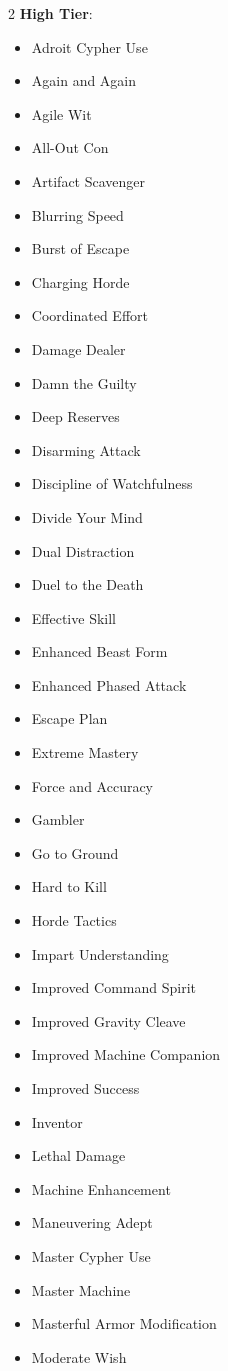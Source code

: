 \begin{multicols}{2}
\textbf{High Tier}:

\begin{itemize}
\item Adroit Cypher Use
\item Again and Again
\item Agile Wit
\item All-Out Con
\item Artifact Scavenger
\item Blurring Speed
\item Burst of Escape
\item Charging Horde
\item Coordinated Effort
\item Damage Dealer
\item Damn the Guilty
\item Deep Reserves
\item Disarming Attack
\item Discipline of Watchfulness
\item Divide Your Mind
\item Dual Distraction
\item Duel to the Death
\item Effective Skill
\item Enhanced Beast Form
\item Enhanced Phased Attack
\item Escape Plan
\item Extreme Mastery
\item Force and Accuracy
\item Gambler
\item Go to Ground
\item Hard to Kill
\item Horde Tactics
\item Impart Understanding
\item Improved Command Spirit
\item Improved Gravity Cleave
\item Improved Machine Companion
\item Improved Success
\item Inventor
\item Lethal Damage
\item Machine Enhancement
\item Maneuvering Adept
\item Master Cypher Use
\item Master Machine
\item Masterful Armor Modification
\item Moderate Wish

\end{itemize}
\end{multicols}
